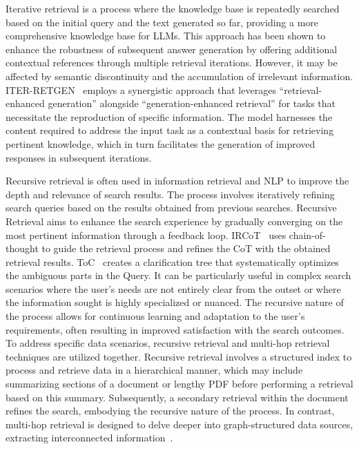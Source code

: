 Iterative retrieval is a process where the knowledge base is repeatedly searched based on the initial query and the text generated so far, providing a more comprehensive knowledge base for LLMs. This approach has been shown to enhance the robustness of subsequent answer generation by offering additional contextual references through multiple retrieval iterations. However, it may be affected by semantic discontinuity and the accumulation of irrelevant information. ITER-RETGEN~ employs a synergistic approach that leverages ``retrieval-enhanced generation'' alongside ``generation-enhanced retrieval'' for tasks that necessitate the reproduction of specific information. The model harnesses the content required to address the input task as a contextual basis for retrieving pertinent knowledge, which in turn facilitates the generation of improved responses in subsequent iterations.

Recursive retrieval is often used in information retrieval and NLP to improve the depth and relevance of search results. The process involves iteratively refining search queries based on the results obtained from previous searches. Recursive Retrieval aims to enhance the search experience by gradually converging on the most pertinent information through a feedback loop. IRCoT~ uses chain-of-thought to guide the retrieval process and refines the CoT with the obtained retrieval results. ToC~ creates a clarification tree that systematically optimizes the ambiguous parts in the Query. It can be particularly useful in complex search scenarios where the user's needs are not entirely clear from the outset or where the information sought is highly specialized or nuanced. The recursive nature of the process allows for continuous learning and adaptation to the user's requirements, often resulting in improved satisfaction with the search outcomes.
To address specific data scenarios, recursive retrieval and multi-hop retrieval techniques are utilized together. Recursive retrieval involves a structured index to process and retrieve data in a hierarchical manner, which may include summarizing sections of a document or lengthy PDF before performing a retrieval based on this summary. Subsequently, a secondary retrieval within the document refines the search, embodying the recursive nature of the process. In contrast, multi-hop retrieval is designed to delve deeper into graph-structured data sources, extracting interconnected information~.

